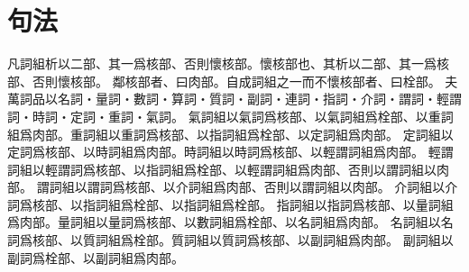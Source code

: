 \chapter*{句法}
凡詞組析以二部、其一爲核部、否則懷核部。懷核部也、其析以二部、其一爲核部、否則懷核部。
鄰核部者、曰肉部。自成詞組之一而不懷核部者、曰栓部。
夫萬詞品以名詞・量詞・數詞・算詞・質詞・副詞・連詞・指詞・介詞・謂詞・輕謂詞・時詞・定詞・重詞・氣詞。
氣詞組以氣詞爲核部、以氣詞組爲栓部、以重詞組爲肉部。重詞組以重詞爲核部、以指詞組爲栓部、以定詞組爲肉部。
定詞組以定詞爲核部、以時詞組爲肉部。時詞組以時詞爲核部、以輕謂詞組爲肉部。
輕謂詞組以輕謂詞爲核部、以指詞組爲栓部、以輕謂詞組爲肉部、否則以謂詞組以肉部。
謂詞組以謂詞爲核部、以介詞組爲肉部、否則以謂詞組以肉部。
介詞組以介詞爲核部、以指詞組爲栓部、以指詞組爲栓部。
指詞組以指詞爲核部、以量詞組爲肉部。量詞組以量詞爲核部、以數詞組爲栓部、以名詞組爲肉部。
名詞組以名詞爲核部、以質詞組爲栓部。質詞組以質詞爲核部、以副詞組爲肉部。
副詞組以副詞爲栓部、以副詞組爲肉部。
